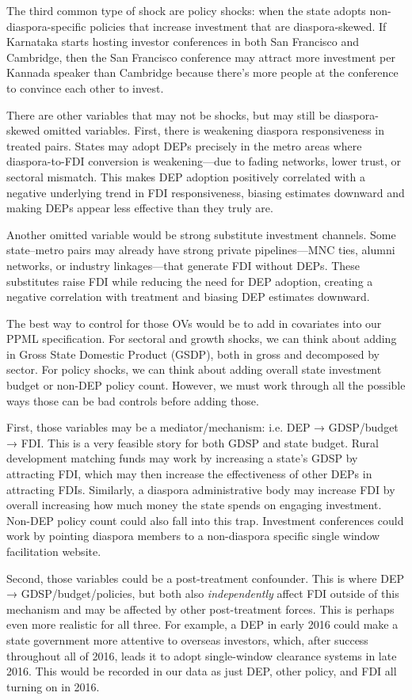 \documentclass[doublespace,nopageskip]{UVAthesis}
\begin{document}
The third common type of shock are policy shocks: when the state adopts non-diaspora-specific policies that increase investment that are diaspora-skewed. If Karnataka starts hosting investor conferences in both San Francisco and Cambridge, then the San Francisco conference may attract more investment per Kannada speaker than Cambridge because there's more people at the conference to convince each other to invest.

There are other variables that may not be shocks, but may still be diaspora-skewed omitted variables. First, there is weakening diaspora responsiveness in treated pairs. States may adopt DEPs precisely in the metro areas where diaspora-to-FDI conversion is weakening—due to fading networks, lower trust, or sectoral mismatch. This makes DEP adoption positively correlated with a negative underlying trend in FDI responsiveness, biasing estimates downward and making DEPs appear less effective than they truly are.

Another omitted variable would be strong substitute investment channels. Some state–metro pairs may already have strong private pipelines—MNC ties, alumni networks, or industry linkages—that generate FDI without DEPs. These substitutes raise FDI while reducing the need for DEP adoption, creating a negative correlation with treatment and biasing DEP estimates downward.

The best way to control for those OVs would be to add in covariates into our PPML specification. For sectoral and growth shocks, we can think about adding in Gross State Domestic Product (GSDP), both in gross and decomposed by sector. For policy shocks, we can think about adding overall state investment budget or non-DEP policy count. However, we must work through all the possible ways those can be bad controls before adding those.

First, those variables may be a mediator/mechanism: i.e. DEP → GDSP/budget → FDI. This is a very feasible story for both GDSP and state budget. Rural development matching funds may work by increasing a state's GDSP by attracting FDI, which may then increase the effectiveness of other DEPs in attracting FDIs. Similarly, a diaspora administrative body may increase FDI by overall increasing how much money the state spends on engaging investment. Non-DEP policy count could also fall into this trap. Investment conferences could work by pointing diaspora members to a non-diaspora specific single window facilitation website.

Second, those variables could be a post-treatment confounder. This is where DEP → GDSP/budget/policies, but both also \textit{independently} affect FDI outside of this mechanism and may be affected by other post-treatment forces. This is perhaps even more realistic for all three. For example, a DEP in early 2016 could make a state government more attentive to overseas investors, which, after success throughout all of 2016, leads it to adopt single-window clearance systems in late 2016. This would be recorded in our data as just DEP, other policy, and FDI all turning on in 2016.
\end{document}

